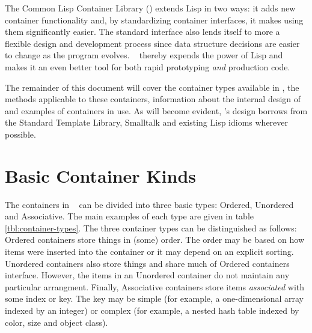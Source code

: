 \documentclass{acm_proc_article-sp}
\begin{document}
The  Common Lisp Container Library (\clcl) extends Lisp in two ways: it
adds new container functionality and, by standardizing container
interfaces, it makes using them significantly easier. The standard
interface also lends itself to more a flexible design and development
process since data structure decisions are easier to change as the program
evolves. \clcl~ thereby expends the power of Lisp and makes it an even
better tool for both rapid prototyping \emph{and} production code.

The remainder of this document will cover the container types available
in \clcl, the methods applicable to these containers, information about
the internal design of \clcl and examples of containers in use. 
As will become evident, \clcl's design borrows from the Standard Template
Library, Smalltalk and existing Lisp idioms wherever possible.
 

\section{Basic Container Kinds}
The containers in \clcl~ can be divided into three basic types: Ordered,
Unordered and Associative. The main examples of each type are given in
table \ref{tbl:container-types}. The three container types can be distinguished as follows: Ordered
containers store things in (some) order. The order may be based on how
items were inserted into the container or it may depend on an explicit
sorting. Unordered containers also store things and share much of
Ordered containers interface. However, the items in an Unordered
container do not maintain any particular arrangment. Finally, Associative
containers store items {\emph {associated}} with some index or key.
The key may be simple (for example, a one-dimensional array indexed by an
integer) or complex (for example, a nested hash table indexed
by color, size and object class).  
\end{document}
